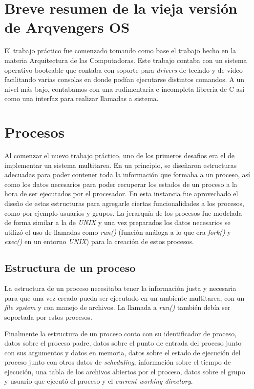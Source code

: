 \documentclass[a4paper,10pt]{article}
\begin{document}
\newpage
\section{Breve resumen de la vieja versión de Arqvengers OS}
El trabajo práctico fue comenzado tomando como base el trabajo hecho en la materia Arquitectura de las Computadoras.
 Este trabajo contaba con un sistema operativo booteable que contaba con soporte para \textit{drivers} de
  teclado y de video facilitando varias consolas en donde podían ejecutarse distintos comandos. 
  A un nivel más bajo, contabamos con una rudimentaria e incompleta librería de C así como una interfaz para realizar
  llamadas a sistema.
\newpage
\section{Procesos}
    Al comenzar el nuevo trabajo práctico, uno de los primeros desafios era el de implementar un sistema multitarea.
     En un principio, se diseñaron estructuras adecuadas para poder contener toda la información que formaba a un proceso,
      así como los datos necesarios para poder recuperar los estados de un proceso a la hora de ser ejecutados
      por el procesador. En esta instancia fue aprovechado el diseño de estas estructuras para agregarle ciertas
      funcionalidades a los procesos, como por ejemplo usuarios y grupos.
     La jerarquía de los procesos fue modelada de forma similar a la de \textit{UNIX} y una vez preparados los datos
      necesarios se utilizó el uso de llamadas como \textit{run()} (función análoga a lo que era \textit{fork()} y
      \textit{exec()} en un entorno \textit{UNIX}) para la creación de estos procesos.

    \subsection{Estructura de un proceso}
    
    La estructura de un proceso necesitaba tener la información justa y necesaria para que una vez creado pueda ser 
    ejecutado en un ambiente multitarea, con un \textit{file system} y con manejo de archivos. La llamada a 
    \textit{run()} también debía ser soportada por estos procesos.

    Finalmente la estructura de un proceso conto con su identificador de proceso, datos sobre el proceso padre, datos
    sobre el punto de entrada del proceso junto con sus argumentos y datos en memoria, datos sobre el estado de ejecución
    del proceso junto con otros datos de \textit{scheduling}, información sobre el tiempo de ejecución, una tabla de
    los archivos abiertos por el proceso, datos sobre el grupo y usuario que ejecutó el proceso y el 
    \textit{current working directory}.
\end{document}
